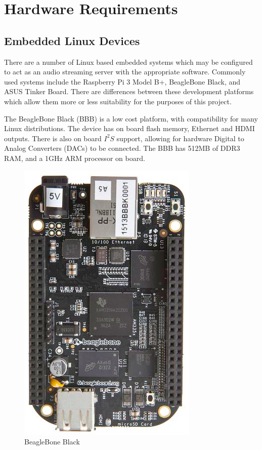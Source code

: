 \documentclass[11pt,a4paper,headinclude=false,footinclude=false]{scrreprt}
\begin{document}
\section{Hardware Requirements}\label{hardware-requirements}

\subsection{Embedded Linux Devices}\label{embedded-linux-devices}

There are a number of Linux based embedded systems which may be
configured to act as an audio streaming server with the appropriate
software. Commonly used systems include the Raspberry Pi 3 Model B+,
BeagleBone Black, and ASUS Tinker Board. There are differences between
these development platforms which allow them more or less suitability
for the purposes of this project.

The BeagleBone Black (BBB) is a low cost platform, with compatibility
for many Linux distributions. The device has on board flash memory,
Ethernet and HDMI outputs. There is also on board \(I^2S\) support,
allowing for hardware Digital to Analog Converters (DACs) to be
connected. The BBB has 512MB of DDR3 RAM, and a 1GHz ARM processor on
board\cite{BBB18}.

\begin{figure}[H]
\includegraphics{BackgroundLitSurvey/BBB.jpg}
\centering
\caption{BeagleBone Black\cite{BBB18}}
\label{BBBFig}
\end{figure}
\end{document}
